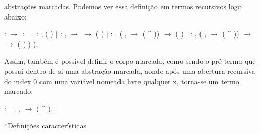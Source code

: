 abstrações marcadas. Podemos ver essa definição em termos recursivos logo abaixo:\begin{coqdoccode}
\coqdocemptyline
\coqdocnoindent
{}  :  \ensuremath{\rightarrow}  :=\coqdoceol
\coqdocindent{1.00em}
\ensuremath{|}  : \coqdockw{\ensuremath{\forall}} ,\coqdoceol
\coqdocindent{3.00em}
 ( )\coqdoceol
\coqdocindent{1.00em}
\ensuremath{|}  : \coqdockw{\ensuremath{\forall}}  ,\coqdoceol
\coqdocindent{3.00em}
  \ensuremath{\rightarrow} \coqdoceol
\coqdocindent{3.00em}
  \ensuremath{\rightarrow} \coqdoceol
\coqdocindent{3.00em}
 (  )\coqdoceol
\coqdocindent{1.00em}
\ensuremath{|}  : \coqdockw{\ensuremath{\forall}}  ,\coqdoceol
\coqdocindent{3.00em}
(\coqdockw{\ensuremath{\forall}} ,    \ensuremath{\rightarrow}  ( \^{} )) \ensuremath{\rightarrow}\coqdoceol
\coqdocindent{3.00em}
 ( )\coqdoceol
\coqdocindent{1.00em}
\ensuremath{|}  : \coqdockw{\ensuremath{\forall}}   ,\coqdoceol
\coqdocindent{3.00em}
(\coqdockw{\ensuremath{\forall}} ,    \ensuremath{\rightarrow}  ( \^{} )) \ensuremath{\rightarrow}\coqdoceol
\coqdocindent{3.00em}
  \ensuremath{\rightarrow}\coqdoceol
\coqdocindent{3.00em}
 ( ( ) ).\coqdoceol
\coqdocemptyline
\end{coqdoccode}
Assim, também é possível definir o corpo marcado, como sendo o pré-termo que possui dentro de 
si uma abstração marcada, aonde após uma abertura recursiva do index 0 com uma variável nomeada 
livre qualquer x, torna-se um termo marcado:\begin{coqdoccode}
\coqdocemptyline
\coqdocnoindent
{}   :=\coqdoceol
\coqdocindent{1.00em}
\coqdoctac{\ensuremath{\exists}} , \coqdockw{\ensuremath{\forall}} ,    \ensuremath{\rightarrow}  ( \^{} ).\coqdoceol
\coqdocemptyline
\coqdocnoindent
{}  .\coqdoceol
\coqdocemptyline
\coqdocemptyline
\coqdocemptyline
\end{coqdoccode}
*Definições características 

